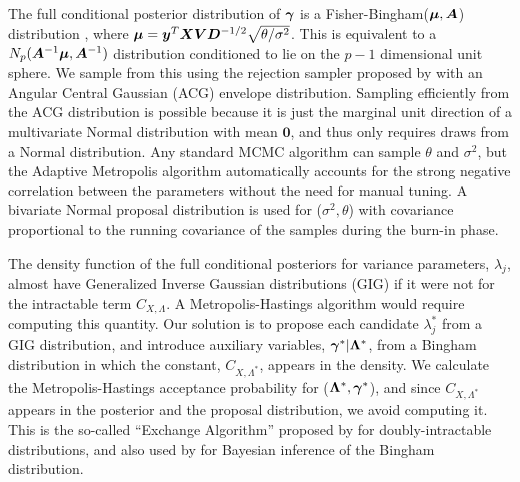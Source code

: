 \documentclass[12pt]{article}
\newcommand{\A}{{\bm  A}}
\newcommand{\D}{{\bm  D}}
\newcommand{\V}{{\bm V}}
\newcommand{\X}{{\bm  X}}
\newcommand{\Lambdabf}{{\mathbf \Lambda}}
\newcommand{\ybf}{{\bm y}}
\newcommand{\zerobf}{{\mathbf 0}}
\newcommand{\greekbold}[1]{\mbox{\boldmath $#1$}}
\newcommand{\gammabf}{\greekbold{\gamma}}
\newcommand{\mubf}{\greekbold{\mu}}
\newcommand{\s}{{\sigma^2}}
\begin{document}
The full conditional posterior distribution of $\gammabf$ is a Fisher-Bingham($\mubf, \A$) distribution \citep{kent1982fisher}, where $\mubf = \ybf^T\X \V\D^{-1/2} \sqrt{\theta/\s}$.
This is equivalent to a $N_p(\A^{-1}\mubf, \A^{-1})$ distribution conditioned to lie on the $p-1$ dimensional unit sphere.
We sample from this using the rejection sampler proposed by \cite{kent2013new} with an Angular Central Gaussian (ACG) envelope distribution.
Sampling efficiently from the ACG distribution is possible because it is just the marginal unit direction of a multivariate Normal distribution with mean $\zerobf$, and thus only requires draws from a Normal distribution.
Any standard MCMC algorithm can sample $\theta$ and $\sigma^2$, but the Adaptive Metropolis algorithm \citep{haario2001adaptive} automatically accounts for the strong negative correlation between the parameters without the need for manual tuning.
A bivariate Normal proposal distribution is used for ($\sigma^2, \theta$) with covariance proportional to the running covariance of the samples during the burn-in phase.

The density function of the full conditional posteriors for variance parameters, $\lambda_j$, almost have Generalized Inverse Gaussian distributions (GIG) if it were not for the intractable term $C_{X, \Lambda}$.
A Metropolis-Hastings algorithm would require computing this quantity.
Our solution is to propose each candidate $\lambda^*_j$ from a GIG distribution, and introduce auxiliary variables, $\gammabf^*|\Lambdabf^*$, from a Bingham distribution in which the constant, $C_{X, \Lambda^*}$, appears in the density.
We calculate the Metropolis-Hastings acceptance probability for ($\Lambdabf^*, \gammabf^*$), and since $C_{X, \Lambda^*}$ appears in the posterior and the proposal distribution, we avoid computing it.
This is the so-called ``Exchange Algorithm'' proposed by \cite{murray2006} for doubly-intractable distributions, and also used by \cite{fallaize2016exact} for Bayesian inference of the Bingham distribution.
\end{document}
